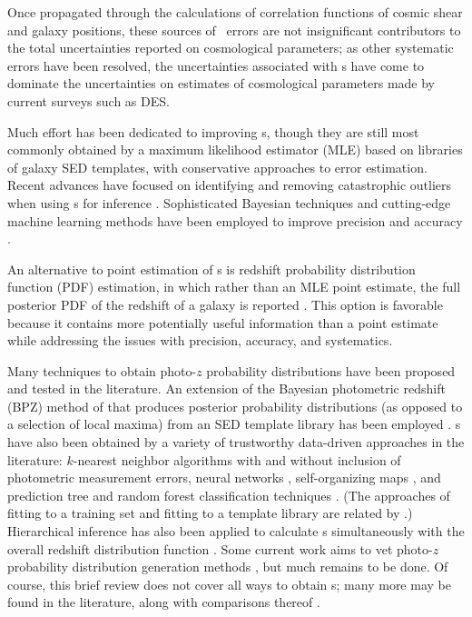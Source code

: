 Once propagated through the calculations of correlation functions of cosmic shear and galaxy positions, these sources of \pz\ errors are not insignificant contributors to the total uncertainties reported on cosmological parameters; as other systematic errors have been resolved, the uncertainties associated with \pz s have come to dominate the uncertainties on estimates of cosmological parameters made by current surveys such as DES.

Much effort has been dedicated to improving \pz s, though they are still most commonly obtained by a maximum likelihood estimator (MLE) based on libraries of galaxy SED templates, with conservative approaches to error estimation.  
Recent advances have focused on identifying and removing catastrophic outliers when using \pz s for 
inference \citep{Gorecki2014}.  
Sophisticated Bayesian techniques and cutting-edge machine learning methods have been employed to improve precision \citep{Carliles2010} and accuracy \citep{Sadeh2015}. 

An alternative to point estimation of \pz s is redshift probability distribution function (PDF) estimation, in which rather than an MLE point estimate, the full posterior PDF of the redshift of a galaxy is reported \citep{Koo1999}.  
This option is favorable because it contains more potentially useful information than a point estimate while addressing the issues with precision, accuracy, and systematics.  

Many techniques to obtain photo-$z$ probability distributions have been proposed and tested in the literature.  
An extension of the Bayesian photometric redshift (BPZ) method of \citet{Benitez2000} that produces posterior probability distributions (as opposed to a selection of local maxima) from an SED template library has been employed \citep{Hildebrandt2012, Kelly2014, Lopez-Sanjuan2015}.  
\Pzpdf s have also been obtained by a variety of trustworthy data-driven approaches in the literature: $k$-nearest neighbor algorithms with \citep{Ball2008} and without \citep{Sheldon2012} inclusion of photometric measurement errors, neural networks \citep{Bonnett2015a}, self-organizing maps \citep{CarrascoKind2014a}, and prediction tree and random forest classification techniques \citep{Carliles2010, CarrascoKind2013}.  
(The approaches of fitting to a training set and fitting to a template library are related by \citet{Budavari2009}.)  
Hierarchical inference has also been applied to calculate \pzpdf s simultaneously with the overall redshift distribution function \citep{Leistedt2016}.  
Some current work aims to vet photo-$z$ probability distribution generation methods \citep{Wittman2016}, but much remains to be done.  
Of course, this brief review does not cover all ways to obtain \pzpdf s; many more may be found in the literature, along with comparisons thereof \citep{Hildebrandt2010, Dahlen2013, Sanchez2013, Bonnett2015}.

